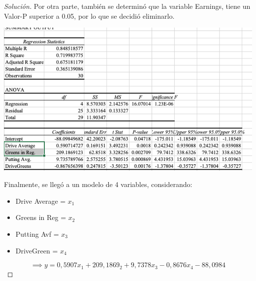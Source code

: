 \documentclass[a4paper,12pt]{article}
\newenvironment{solution}
  {\renewcommand\qedsymbol{$\blacksquare$}\begin{proof}[Solución]}
  {\end{proof}}
\begin{document}
\begin{solution}
Por otra parte, también se determinó que la variable Earnings, tiene un Valor-P superior a 0.05, por lo que se decidió eliminarlo. 

\begin{center}
    \includegraphics[scale=0.5]{Imagenes/70-5.png}
\end{center}

Finalmente, se llegó a un modelo de 4 variables, considerando:
\begin{itemize}
    \item Drive Average = $x_1$
    \item Greens in Reg = $x_2$
    \item Putting Avf = $x_3$
    \item DriveGreen = $x_4$
\end{itemize}
$$\implies y=0,5907x_1+209,1869_2+9,7378x_3-0,8676x_4-88,0984$$




\end{solution}
\end{document}
